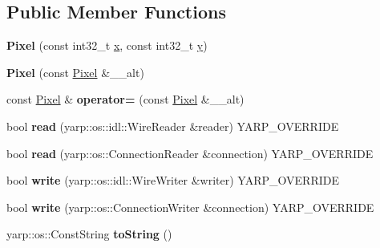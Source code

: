 \subsection*{Public Member Functions}
\begin{DoxyCompactItemize}
\item 
\mbox{\label{classyarp_1_1sig_1_1Pixel_a892add3151640573f74252f120e60d52}} 
{\bfseries Pixel} (const int32\+\_\+t \hyperlink{classyarp_1_1sig_1_1Pixel_a4d6a5b0c693035c4012aa15e8f8b4b64}{x}, const int32\+\_\+t \hyperlink{classyarp_1_1sig_1_1Pixel_a2ac1d9f1602f323fb9ca9fe62541aeb2}{y})
\item 
\mbox{\label{classyarp_1_1sig_1_1Pixel_ad41b620ffa2be8a6440bb8c287be6a21}} 
{\bfseries Pixel} (const \hyperlink{classyarp_1_1sig_1_1Pixel}{Pixel} \&\+\_\+\+\_\+alt)
\item 
\mbox{\label{classyarp_1_1sig_1_1Pixel_a3f766f3526afe7a8359cd8a91def844d}} 
const \hyperlink{classyarp_1_1sig_1_1Pixel}{Pixel} \& {\bfseries operator=} (const \hyperlink{classyarp_1_1sig_1_1Pixel}{Pixel} \&\+\_\+\+\_\+alt)
\item 
\mbox{\label{classyarp_1_1sig_1_1Pixel_a3eb21115137d54d4b0e6bd0d26615e8d}} 
bool {\bfseries read} (yarp\+::os\+::idl\+::\+Wire\+Reader \&reader) Y\+A\+R\+P\+\_\+\+O\+V\+E\+R\+R\+I\+DE
\item 
\mbox{\label{classyarp_1_1sig_1_1Pixel_a034581e387643843137b2d3fa35574f0}} 
bool {\bfseries read} (yarp\+::os\+::\+Connection\+Reader \&connection) Y\+A\+R\+P\+\_\+\+O\+V\+E\+R\+R\+I\+DE
\item 
\mbox{\label{classyarp_1_1sig_1_1Pixel_aa62c1a48bf1330fa76cc0686ed7b94a5}} 
bool {\bfseries write} (yarp\+::os\+::idl\+::\+Wire\+Writer \&writer) Y\+A\+R\+P\+\_\+\+O\+V\+E\+R\+R\+I\+DE
\item 
\mbox{\label{classyarp_1_1sig_1_1Pixel_a74c555115838381ab66df3e1df03ff7d}} 
bool {\bfseries write} (yarp\+::os\+::\+Connection\+Writer \&connection) Y\+A\+R\+P\+\_\+\+O\+V\+E\+R\+R\+I\+DE
\item 
\mbox{\label{classyarp_1_1sig_1_1Pixel_a6236575491a91f4a48ecc47e41fa3de3}} 
yarp\+::os\+::\+Const\+String {\bfseries to\+String} ()
\end{DoxyCompactItemize}
